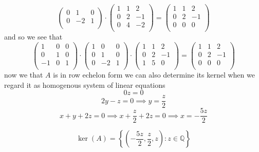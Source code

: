 \begin{example}
\[\begin{pmatrix}
         0 & 1  & 0 \\
         0 & -2 & 1 \\
     \end{pmatrix} \cdot
         \begin{pmatrix}
         1 & 1 &  2 \\
         0 & 2 & -1 \\
         0 & 4 & -2 \\
      \end{pmatrix} = \begin{pmatrix}
         1 & 1 &  2 \\
         0 & 2 & -1 \\
         0 & 0 & 0 \\
      \end{pmatrix}
   \]
   and so we see that
   \[\begin{pmatrix}
         1  & 0 & 0 \\
         0  & 1 & 0 \\
         -1 & 0 & 1 \\
      \end{pmatrix} \cdot \begin{pmatrix}
         1 & 0  & 0 \\
         0 & 1  & 0 \\
         0 & -2 & 1 \\
     \end{pmatrix}  \cdot \begin{pmatrix}
         1 & 1 &  2 \\
         0 & 2 & -1 \\
         1 & 5 & 0 \\
      \end{pmatrix} = \begin{pmatrix}
         1 & 1 &  2 \\
         0 & 2 & -1 \\
         0 & 0 & 0 \\
      \end{pmatrix}
   \]
   now we that \(A\) is in row echelon form we can also determine its kernel when we regard it as homogenous system of linear equations
   \[0z = 0\]
   \[2y - z = 0 \implies y = \frac{z}{2}\]
   \[x + y + 2z = 0 \implies x + \frac{z}{2} + 2z = 0 \implies x = -\frac{5z}{2}\]

   \[\ker(A) = \left\{\left(-\frac{5z}{2}, \frac{z}{2}, z\right): z \in \mathbb{Q}\right\}\]
\end{example}


